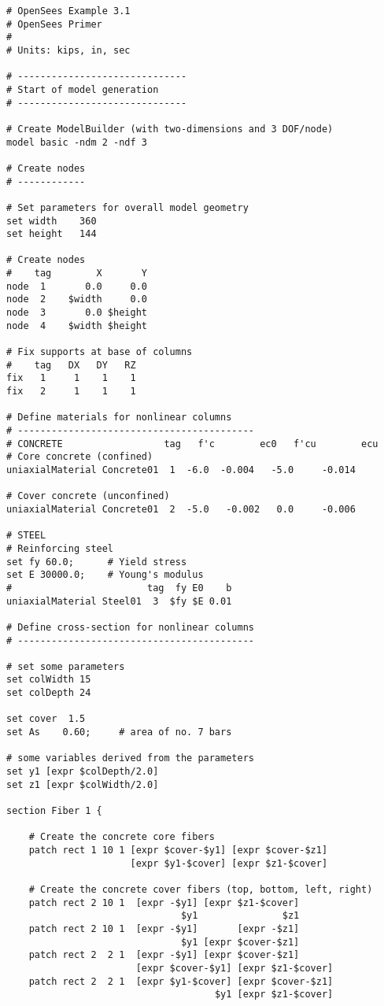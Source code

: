 \documentclass[12pt]{article}
\begin{document}
\vspace{0.2in} 
{\sf\small
\begin{verbatim}
# OpenSees Example 3.1
# OpenSees Primer
#
# Units: kips, in, sec

# ------------------------------
# Start of model generation
# ------------------------------

# Create ModelBuilder (with two-dimensions and 3 DOF/node)
model basic -ndm 2 -ndf 3

# Create nodes
# ------------

# Set parameters for overall model geometry
set width    360
set height   144

# Create nodes
#    tag        X       Y 
node  1       0.0     0.0 
node  2    $width     0.0 
node  3       0.0 $height
node  4    $width $height

# Fix supports at base of columns
#    tag   DX   DY   RZ
fix   1     1    1    1
fix   2     1    1    1

# Define materials for nonlinear columns
# ------------------------------------------
# CONCRETE                  tag   f'c        ec0   f'cu        ecu
# Core concrete (confined)
uniaxialMaterial Concrete01  1  -6.0  -0.004   -5.0     -0.014

# Cover concrete (unconfined)
uniaxialMaterial Concrete01  2  -5.0   -0.002   0.0     -0.006

# STEEL
# Reinforcing steel 
set fy 60.0;      # Yield stress
set E 30000.0;    # Young's modulus
#                        tag  fy E0    b
uniaxialMaterial Steel01  3  $fy $E 0.01

# Define cross-section for nonlinear columns
# ------------------------------------------

# set some parameters
set colWidth 15
set colDepth 24 

set cover  1.5
set As    0.60;     # area of no. 7 bars

# some variables derived from the parameters
set y1 [expr $colDepth/2.0]
set z1 [expr $colWidth/2.0]

section Fiber 1 {

    # Create the concrete core fibers
    patch rect 1 10 1 [expr $cover-$y1] [expr $cover-$z1] 
                      [expr $y1-$cover] [expr $z1-$cover]

    # Create the concrete cover fibers (top, bottom, left, right)
    patch rect 2 10 1  [expr -$y1] [expr $z1-$cover] 
                               $y1               $z1
    patch rect 2 10 1  [expr -$y1]       [expr -$z1] 
                               $y1 [expr $cover-$z1]
    patch rect 2  2 1  [expr -$y1] [expr $cover-$z1] 
                       [expr $cover-$y1] [expr $z1-$cover]
    patch rect 2  2 1  [expr $y1-$cover] [expr $cover-$z1] 
                                     $y1 [expr $z1-$cover]


\end{verbatim}}
\end{document}

